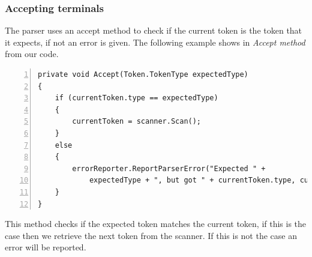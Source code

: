		\subsubsection{Accepting terminals}
			The parser uses an accept method to check if the current token is the token that it expects, if not an error is given.
			The following example shows in {\it Accept method} from our code.
			\begin{lstlisting}[basicstyle=\small\sffamily,
					keywords={break,case,const,continue,default,else,enum,
					for,if,return,switch,while,do,long,void,int,float,double,
					char,struct,typedef,include,size\_t},
					keywordstyle={\color{blue}},
					comment={[l]{//}}, morecomment={[s]{/*}{*/}}, commentstyle=\itshape,
					columns={[l]flexible}, numbers=left, numberstyle=\tiny,
					frameround=fftt, frame=shadowbox, captionpos=b,
					caption={Accept method for accepting tokens},
					label=impl:accept]
private void Accept(Token.TokenType expectedType)
{
	if (currentToken.type == expectedType)
    {
		currentToken = scanner.Scan();
    }
    else
    {
    	errorReporter.ReportParserError("Expected " + 
    		expectedType + ", but got " + currentToken.type, currentToken);
    }
}
			\end{lstlisting}
			This method checks if the expected token matches the current token, if this is the case then we retrieve the next token from the scanner.
			If this is not the case an error will be reported.
			
